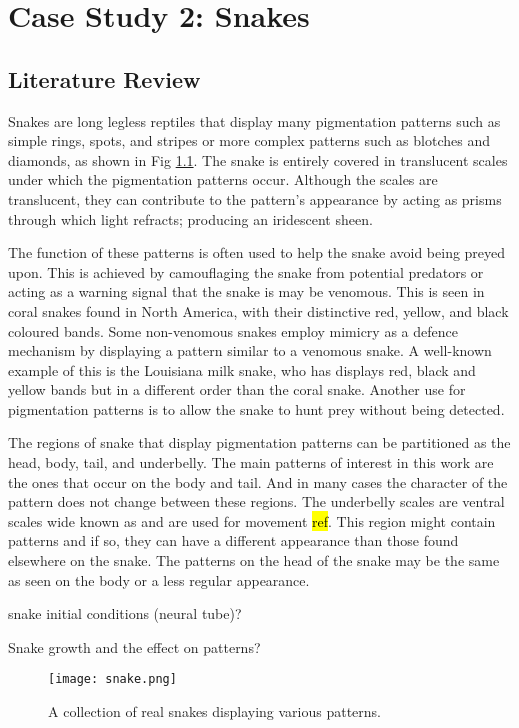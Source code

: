 \chapter{Case Study 2: Snakes}
\section{Literature Review}
Snakes are long legless reptiles that display many pigmentation patterns such as simple rings, spots, and stripes or more complex patterns such as blotches and diamonds, as shown in Fig \ref{fig:realSnakePatterns}. The snake is entirely covered in translucent scales under which the pigmentation patterns occur. Although the scales are translucent, they can contribute to the pattern's appearance by acting as prisms through which light refracts; producing an iridescent sheen. 

The function of these patterns is often used to help the snake avoid being preyed upon. This is achieved by camouflaging the snake from potential predators or acting as a warning signal that the snake is may be venomous. This is seen in coral snakes found in North America, with their distinctive red, yellow, and black coloured bands. Some non-venomous snakes employ mimicry as a defence mechanism by displaying a pattern similar to a venomous snake. A well-known example of this is the Louisiana milk snake, who has displays red, black and yellow bands but in a different order than the coral snake. Another use for pigmentation patterns is to allow the snake to hunt prey without being detected.

The regions of snake that display pigmentation patterns can be partitioned as the head, body, tail, and underbelly. The main patterns of interest in this work are the ones that occur on the body and tail. And in many cases the character of the pattern does not change between these regions. The underbelly scales are ventral scales wide known as and are used for movement \hl{ref}. This region might contain patterns and if so, they can have a different appearance than those found elsewhere on the snake. The patterns on the head of the snake may be the same as seen on the body or a less regular appearance. 

snake initial conditions (neural tube)?

Snake growth and the effect on patterns?
\begin{figure}[p]
	\centering
	\texttt{[image: snake.png]}
	\caption{A collection of real snakes displaying various patterns.}
	\label{fig:realSnakePatterns}
\end{figure}

